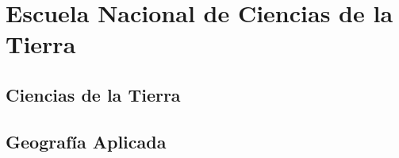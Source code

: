 \section{Escuela Nacional de Ciencias de la Tierra}

\subsection{Ciencias de la Tierra}

\subsection{Geografía Aplicada}
